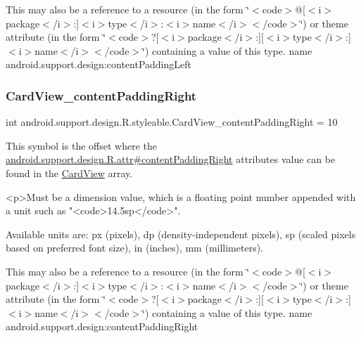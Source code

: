 This may also be a reference to a resource (in the form \char`\"{}$<$code$>$@\mbox{[}$<$i$>$package$<$/i$>$\+:\mbox{]}$<$i$>$type$<$/i$>$\+:$<$i$>$name$<$/i$>$$<$/code$>$\char`\"{}) or theme attribute (in the form \char`\"{}$<$code$>$?\mbox{[}$<$i$>$package$<$/i$>$\+:\mbox{]}\mbox{[}$<$i$>$type$<$/i$>$\+:\mbox{]}$<$i$>$name$<$/i$>$$<$/code$>$\char`\"{}) containing a value of this type.  name android.\+support.\+design\+:content\+Padding\+Left \mbox{\label{classandroid_1_1support_1_1design_1_1R_1_1styleable_a07e43115d158fc9a8769282e868714ff}} 
\subsubsection{\texorpdfstring{Card\+View\+\_\+content\+Padding\+Right}{CardView\_contentPaddingRight}}
{\footnotesize\ttfamily int android.\+support.\+design.\+R.\+styleable.\+Card\+View\+\_\+content\+Padding\+Right = 10\hspace{0.3cm}{\ttfamily [static]}}

This symbol is the offset where the \hyperlink{classandroid_1_1support_1_1design_1_1R_1_1attr_a054943f020d53f79ce410b9278b59a1c}{android.\+support.\+design.\+R.\+attr\#content\+Padding\+Right} attribute\textquotesingle{}s value can be found in the \hyperlink{classandroid_1_1support_1_1design_1_1R_1_1styleable_a56025691fb136d28dc5fce5a25d7c65e}{Card\+View} array.

\begin{DoxyVerb}      <p>Must be a dimension value, which is a floating point number appended with a unit such as "<code>14.5sp</code>".
\end{DoxyVerb}
 Available units are\+: px (pixels), dp (density-\/independent pixels), sp (scaled pixels based on preferred font size), in (inches), mm (millimeters). 

This may also be a reference to a resource (in the form \char`\"{}$<$code$>$@\mbox{[}$<$i$>$package$<$/i$>$\+:\mbox{]}$<$i$>$type$<$/i$>$\+:$<$i$>$name$<$/i$>$$<$/code$>$\char`\"{}) or theme attribute (in the form \char`\"{}$<$code$>$?\mbox{[}$<$i$>$package$<$/i$>$\+:\mbox{]}\mbox{[}$<$i$>$type$<$/i$>$\+:\mbox{]}$<$i$>$name$<$/i$>$$<$/code$>$\char`\"{}) containing a value of this type.  name android.\+support.\+design\+:content\+Padding\+Right \mbox{\label{classandroid_1_1support_1_1design_1_1R_1_1styleable_a3f11c2bc91d13fa21d30841b88ee4b02}} 
